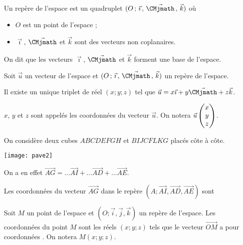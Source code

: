\documentclass[11pt,fleqn, openany]{book} %
\begin{document}
\begin{definition}Un repère de l'espace est un quadruplet $\Oijk$ où
\begin{itemize}
\item $O$ est un point de l'espace ;
\item $\vec{\imath}$, $\vec {\CMjmath}$ et $\vec k$ sont des vecteurs non coplanaires.
\end{itemize}
On dit que les vecteurs $\vec{\imath}$, $\vec {\CMjmath}$ et $\vec k$ forment une base de l'espace.\end{definition}



\begin{proposition}Soit $\vec u$ un vecteur de l'espace et  $\Oijk$ un repère de l'espace. 

Il existe un unique triplet de réel $(x;y;z)$ tel que $\vec u = x \vec {\imath} + y \vec {\CMjmath} + z \vec k$.

$x$, $y$ et $z$ sont appelés les coordonnées du vecteur $\vec u$. On notera $\vec u\renewcommand{\arraystretch}{1} \renewcommand{\arraystretch}{1}\begin{pmatrix}x\\y\\z\end{pmatrix}$. \end{proposition}

\begin{example}On considère deux cubes $ABCDEFGH$ et $BIJCFLKG$ placés côte à côte.

\begin{center}
\texttt{[image: pave2]}
\end{center}

On a en effet $\overrightarrow{AG}=\ldots\overrightarrow{AI}+\ldots\overrightarrow{AD}+\ldots\overrightarrow{AE}.$

Les coordonnées du vecteur $\overrightarrow{AG}$ dans le repère $(A;\overrightarrow{AI}, \overrightarrow{AD}, \overrightarrow{AE})$ sont 
\vskip10pt
\end{example}

\begin{definition}Soit $M$ un point de l'espace et $(O;\vec i , \vec j ,\vec k)$ un repère de l'espace. Les coordonnées du point $M$ sont les réels $(x;y;z)$ tels que le vecteur $\overrightarrow{OM}$ a pour coordonnées \renewcommand{\arraystretch}{1}. On notera $M(x;y;z)$. \end{definition}
\end{document}
